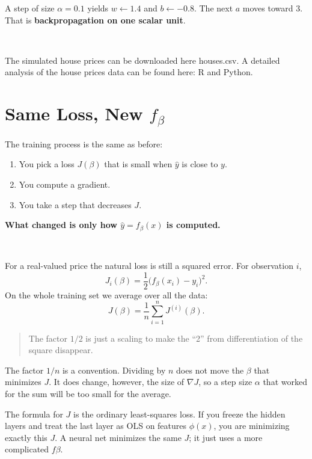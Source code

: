 \documentclass[
]{book}
\begin{document}
A step of size \(\alpha=0.1\) yields \(w\leftarrow 1.4\) and \(b\leftarrow -0.8\). The next \(a\) moves toward \(3\). That is \textbf{backpropagation on one scalar unit}.

~
~

The simulated house prices can be downloaded here houses.csv. A detailed analysis of the house prices data can be found here:
R and Python.

\section{\texorpdfstring{Same Loss, New \(f_\beta\)}{Same Loss, New f\_\textbackslash beta}}\label{same-loss-new-f_beta}

The training process is the same as before:

\begin{enumerate}
\def\labelenumi{\arabic{enumi}.}
\item
  You pick a loss \(J(\beta)\) that is small when \(\hat y\) is close to \(y\).
\item
  You compute a gradient.
\item
  You take a step that decreases \(J\).
\end{enumerate}

\textbf{What changed is only how \(\hat y=f_\beta(x)\) is computed.}

~

For a real-valued price the natural loss is still a squared error. For observation \(i\),
\[J_{i}(\beta)=\frac12\bigl(f_\beta(x_{i})-y_{i}\bigr)^2.\]
On the whole training set we average over all the data:
\[J(\beta)=\frac1n\sum_{i=1}^n J^{(i)}(\beta).\]

\begin{quote}
The factor \(1/2\) is just a scaling to make the ``2'' from differentiation of the square disappear.
\end{quote}

The factor \(1/n\) is a convention. Dividing by \(n\) does not move the \(\beta\) that minimizes \(J\). It does change, however, the size of \(\nabla J\), so a step size \(\alpha\) that worked for the sum will be too small for the average.

The formula for \(J\) is the ordinary least-squares loss. If you freeze the hidden layers and treat the last layer as OLS on features \(\phi(x)\), you are minimizing exactly this \(J\). A neural net minimizes the same \(J\); it just uses a more complicated \(f\beta\).
\end{document}
